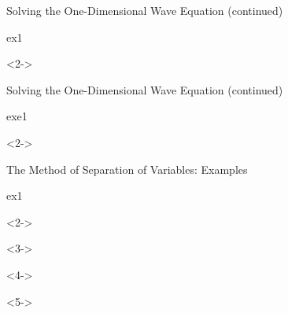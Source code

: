 \def\EMtitlesize{26}\def\EMtitleskip{31}
\begin{frame}{Solving the One-Dimensional Wave Equation (continued)}
\begin{minipage}[t]{500bp}\vspace{0pt}
\begin{EMbox}{ex}{1}{}
\begin{uncoverenv}<2->
\end{uncoverenv}
\end{EMbox}
\end{minipage}
\end{frame}

\def\EMtitlesize{26}\def\EMtitleskip{31}
\begin{frame}{Solving the One-Dimensional Wave Equation (continued)}
\begin{EMbox}{exe}{1}{}
\EMgap
\begin{uncoverenv}<2->
\end{uncoverenv}
\end{EMbox}
\end{frame}

\def\EMtitlesize{26}\def\EMtitleskip{31}
\begin{frame}{The Method of Separation of Variables: Examples}
\begin{EMbox}{ex}{1}{}
\EMgap
\begin{uncoverenv}<2->
\end{uncoverenv}
\EMgap
\begin{uncoverenv}<3->
\end{uncoverenv}
\EMgap
\begin{uncoverenv}<4->
\end{uncoverenv}
\EMgap
\begin{uncoverenv}<5->
\end{uncoverenv}
\end{EMbox}
\end{frame}

